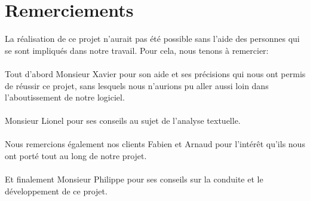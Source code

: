 \chapter*{Remerciements}
La réalisation de ce projet n'aurait pas été possible sans l'aide des personnes qui se sont impliqués dans notre travail. Pour cela, nous tenons à remercier:\\\\

Tout d’abord Monsieur Xavier  pour son aide et ses précisions qui nous ont permis de réussir ce projet, sans lesquels nous n'aurions pu aller aussi loin dans l'aboutissement de notre logiciel.\\\\
Monsieur Lionel  pour ses conseils au sujet de l’analyse textuelle.\\\\
Nous remercions également nos clients Fabien  et Arnaud  pour l’intérêt qu’ils nous ont porté tout au long de notre projet.\\\\
Et finalement Monsieur Philippe  pour ses conseils sur la conduite et le développement de ce projet.